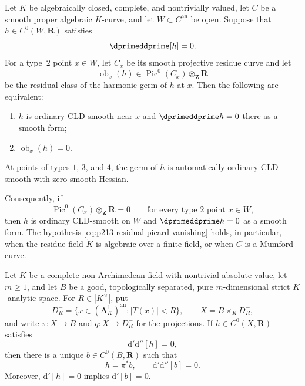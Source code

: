 
\begin{proposition}
\label{prop:p213-residual-picard-smooth-curve}
Let $K$ be algebraically closed, complete, and nontrivially valued, let
$C$ be a smooth proper algebraic $K$-curve, and let
$W\subset C^{\mathrm{an}}$ be open.  Suppose that
$h\in C^0(W,\mathbf R)$ satisfies
\[
                         \dprimeddprime[h]=0.
\]
For a type~$2$ point $x\in W$, let $C_x$ be its smooth projective
residue curve and let
\[
 \operatorname{ob}_x(h)\in
 \operatorname{Pic}^0(C_x)\otimes_{\mathbf Z}\mathbf R
\]
be the residual class of the harmonic germ of $h$ at $x$.  Then the
following are equivalent:
\begin{enumerate}
\item $h$ is ordinary CLD-smooth near $x$ and
      $\dprimeddprime h=0$ there as a smooth form;
\item $\operatorname{ob}_x(h)=0$.
\end{enumerate}
At points of types $1$, $3$, and $4$, the germ of $h$ is automatically
ordinary CLD-smooth with zero smooth Hessian.

Consequently, if
\begin{equation}
\label{eq:p213-residual-picard-vanishing}
       \operatorname{Pic}^0(C_x)\otimes_{\mathbf Z}\mathbf R=0
       \qquad\text{for every type~$2$ point }x\in W,
\end{equation}
then $h$ is ordinary CLD-smooth on $W$ and
$\dprimeddprime h=0$ as a smooth form.  The hypothesis
\eqref{eq:p213-residual-picard-vanishing} holds, in particular, when the
residue field $\widetilde K$ is algebraic over a finite field, or when
$C$ is a Mumford curve.
\end{proposition}

\begin{proposition}
\label{prop:p062-open-disc-descent}
Let $K$ be a complete non-Archimedean field with nontrivial absolute
value, let $m\geq1$, and let $B$ be a good, topologically separated,
pure $m$-dimensional strict $K$-analytic space.  For
$R\in|K^\times|$, put
\[
 D_R^-=\{x\in(\mathbf A^1_K)^{\mathrm{an}}:|T(x)|<R\},
 \qquad X=B\times_KD_R^-,
\]
and write $\pi:X\to B$ and $q:X\to D_R^-$ for the projections.  If
$h\in C^0(X,\mathbf R)$ satisfies
\[
                         \mathrm d'\mathrm d''[h]=0,
\]
then there is a unique $b\in C^0(B,\mathbf R)$ such that
\[
                         h=\pi^*b,
                         \qquad
                         \mathrm d'\mathrm d''[b]=0.
\]
Moreover, $\mathrm d'[h]=0$ implies $\mathrm d'[b]=0$.
\end{proposition}

